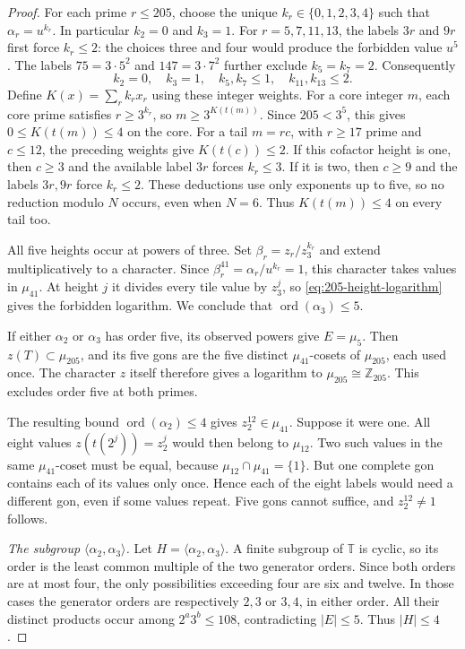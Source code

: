 \documentclass[10pt,a4paper]{amsart}
\newcommand{\T}{\mathbb T}
\newcommand{\Z}{\mathbb Z}
\begin{document}
\begin{proof}
For each prime $r\le205$, choose the unique $k_r\in\{0,1,2,3,4\}$
such that $\alpha_r=u^{k_r}$. In particular $k_2=0$ and $k_3=1$.
For $r=5,7,11,13$, the labels $3r$ and $9r$ first force $k_r\le2$:
the choices three and four would produce the forbidden value $u^5$.
The labels $75=3\cdot5^2$ and $147=3\cdot7^2$ further exclude
$k_5=k_7=2$. Consequently
\[
 k_2=0,\quad k_3=1,\quad k_5,k_7\le1,\quad
 k_{11},k_{13}\le2.
\]
Define $K(x)=\sum_r k_rx_r$ using these integer weights.
For a core integer $m$, each core prime satisfies $r\ge3^{k_r}$,
so $m\ge3^{K(t(m))}$. Since $205<3^5$, this gives
$0\le K(t(m))\le4$ on the core.
For a tail $m=rc$, with $r\ge17$ prime and $c\le12$, the preceding
weights give $K(t(c))\le2$. If this cofactor height is one, then
$c\ge3$ and the available label $3r$ forces $k_r\le3$.
If it is two, then $c\ge9$ and the labels $3r,9r$ force $k_r\le2$.
These deductions use only exponents up to five, so no reduction modulo
$N$ occurs, even when $N=6$. Thus $K(t(m))\le4$ on every tail too.

All five heights occur at powers of three. Set
$\beta_r=z_r/z_3^{k_r}$ and extend multiplicatively to a character.
Since $\beta_r^{41}=\alpha_r/u^{k_r}=1$, this character takes values
in $\mu_{41}$. At height $j$ it divides every tile value by $z_3^j$,
so \eqref{eq:205-height-logarithm} gives the forbidden logarithm.
We conclude that $\operatorname{ord}(\alpha_3)\le5$.

If either $\alpha_2$ or $\alpha_3$ has order five, its observed powers
give $E=\mu_5$. Then $z(T)\subset\mu_{205}$, and its five gons are
the five distinct $\mu_{41}$-cosets of $\mu_{205}$, each used once.
The character $z$ itself therefore gives a logarithm to
$\mu_{205}\cong\Z_{205}$. This excludes order five at both primes.

The resulting bound $\operatorname{ord}(\alpha_2)\le4$ gives
$z_2^{12}\in\mu_{41}$. Suppose it were one. All eight values
$z(t(2^j))=z_2^j$ would then belong to $\mu_{12}$. Two such values in
the same $\mu_{41}$-coset must be equal, because
$\mu_{12}\cap\mu_{41}=\{1\}$. But one complete gon contains each
of its values only once. Hence each of the eight labels would need a
different gon, even if some values repeat. Five gons cannot suffice,
and $z_2^{12}\ne1$ follows.

\smallskip\noindent
\emph{The subgroup $\langle\alpha_2,\alpha_3\rangle$.}
Let $H=\langle\alpha_2,\alpha_3\rangle$. A finite subgroup of
$\T$ is cyclic, so its order is the least common multiple of the
two generator orders. Since both orders are at most four, the only
possibilities exceeding four are six and twelve. In those cases the
generator orders are respectively $2,3$ or $3,4$, in either order.
All their distinct products occur among $2^a3^b\le108$, contradicting
$|E|\le5$. Thus $|H|\le4$.


\end{proof}
\end{document}
